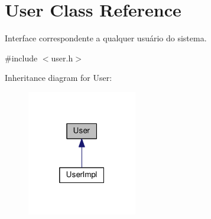\hypertarget{classUser}{}\section{User Class Reference}
\label{classUser}


Interface correspondente a qualquer usuário do sistema.  




{\ttfamily \#include $<$user.\+h$>$}



Inheritance diagram for User\+:
\nopagebreak
\begin{figure}[H]
\begin{center}
\leavevmode
\includegraphics[width=136pt]{dd/de7/classUser__inherit__graph}
\end{center}
\end{figure}
